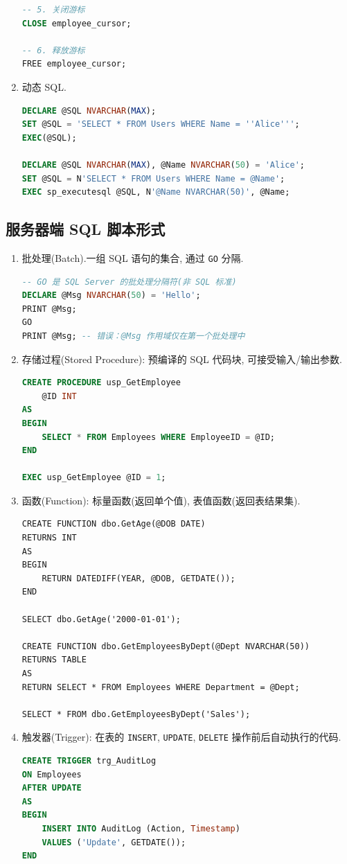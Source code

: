 \begin{enumerate}
\begin{lstlisting}[language=SQL]
-- 5. 关闭游标
CLOSE employee_cursor;

-- 6. 释放游标
FREE employee_cursor;
\end{lstlisting}
  \item 动态 SQL.
\begin{lstlisting}[language=SQL]
DECLARE @SQL NVARCHAR(MAX);
SET @SQL = 'SELECT * FROM Users WHERE Name = ''Alice''';
EXEC(@SQL);

DECLARE @SQL NVARCHAR(MAX), @Name NVARCHAR(50) = 'Alice';
SET @SQL = N'SELECT * FROM Users WHERE Name = @Name';
EXEC sp_executesql @SQL, N'@Name NVARCHAR(50)', @Name;
\end{lstlisting}
\end{enumerate}

\subsection{服务器端 SQL 脚本形式}

\begin{enumerate}
    \item 批处理(Batch).一组 SQL 语句的集合, 通过 \verb|GO| 分隔.
\begin{lstlisting}[language=SQL]
-- GO 是 SQL Server 的批处理分隔符(非 SQL 标准)
DECLARE @Msg NVARCHAR(50) = 'Hello';
PRINT @Msg;
GO
PRINT @Msg; -- 错误：@Msg 作用域仅在第一个批处理中
\end{lstlisting}
    \item 存储过程(Stored Procedure): 预编译的 SQL 代码块, 可接受输入/输出参数.
\begin{lstlisting}[language=SQL]
CREATE PROCEDURE usp_GetEmployee
    @ID INT
AS
BEGIN
    SELECT * FROM Employees WHERE EmployeeID = @ID;
END

EXEC usp_GetEmployee @ID = 1;
\end{lstlisting}
  \item 函数(Function): 标量函数(返回单个值), 表值函数(返回表结果集).
\begin{lstlisting}
CREATE FUNCTION dbo.GetAge(@DOB DATE)
RETURNS INT
AS
BEGIN
    RETURN DATEDIFF(YEAR, @DOB, GETDATE());
END

SELECT dbo.GetAge('2000-01-01');

CREATE FUNCTION dbo.GetEmployeesByDept(@Dept NVARCHAR(50))
RETURNS TABLE
AS
RETURN SELECT * FROM Employees WHERE Department = @Dept;

SELECT * FROM dbo.GetEmployeesByDept('Sales');
\end{lstlisting}
  \item 触发器(Trigger): 在表的 \verb|INSERT|, \verb|UPDATE|, \verb|DELETE| 操作前后自动执行的代码.
\begin{lstlisting}[language=SQL]
CREATE TRIGGER trg_AuditLog
ON Employees
AFTER UPDATE
AS
BEGIN
    INSERT INTO AuditLog (Action, Timestamp)
    VALUES ('Update', GETDATE());
END
\end{lstlisting}
\end{enumerate}
